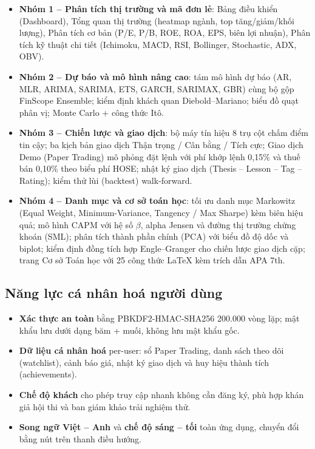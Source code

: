 \documentclass[12pt,a4paper,openany,oneside]{report}
\numberwithin{equation}{chapter}
\begin{document}
\begin{itemize}[leftmargin=22pt,topsep=2pt,itemsep=4pt]
  \item \textbf{Nhóm 1 -- Phân tích thị trường và mã đơn lẻ}: Bảng
        điều khiển (Dashboard), Tổng quan thị trường (heatmap ngành,
        top tăng/giảm/khối lượng), Phân tích cơ bản (P/E, P/B, ROE,
        ROA, EPS, biên lợi nhuận), Phân tích kỹ thuật chi tiết
        (Ichimoku, MACD, RSI, Bollinger, Stochastic, ADX, OBV).
  \item \textbf{Nhóm 2 -- Dự báo và mô hình nâng cao}: tám mô hình dự
        báo (AR, MLR, ARIMA, SARIMA, ETS, GARCH, SARIMAX, GBR) cùng
        bộ gộp FinScope Ensemble; kiểm định khách quan
        Diebold--Mariano; biểu đồ quạt phân vị; Monte Carlo + công
        thức Itô.
  \item \textbf{Nhóm 3 -- Chiến lược và giao dịch}: bộ máy tín hiệu 8
        trụ cột chấm điểm tin cậy; ba kịch bản giao dịch Thận trọng /
        Cân bằng / Tích cực; Giao dịch Demo (Paper Trading) mô phỏng
        đặt lệnh với phí khớp lệnh 0,15\% và thuế bán 0,10\% theo
        biểu phí HOSE; nhật ký giao dịch (Thesis -- Lesson -- Tag --
        Rating); kiểm thử lùi (backtest) walk-forward.
  \item \textbf{Nhóm 4 -- Danh mục và cơ sở toán học}: tối ưu danh mục
        Markowitz (Equal Weight, Minimum-Variance, Tangency / Max
        Sharpe) kèm biên hiệu quả; mô hình CAPM với hệ số $\beta$,
        alpha Jensen và đường thị trường chứng khoán (SML); phân tích
        thành phần chính (PCA) với biểu đồ độ dốc và biplot; kiểm
        định đồng tích hợp Engle--Granger cho chiến lược giao dịch
        cặp; trang Cơ sở Toán học với 25 công thức LaTeX kèm trích dẫn
        APA 7th.
\end{itemize}

\subsection{Năng lực cá nhân hoá người dùng}

\begin{itemize}[leftmargin=22pt,topsep=2pt,itemsep=3pt]
  \item \textbf{Xác thực an toàn} bằng PBKDF2-HMAC-SHA256 200.000 vòng
        lặp; mật khẩu lưu dưới dạng băm + muối, không lưu mật khẩu
        gốc.
  \item \textbf{Dữ liệu cá nhân hoá} per-user: sổ Paper Trading,
        danh sách theo dõi (watchlist), cảnh báo giá, nhật ký giao
        dịch và huy hiệu thành tích (achievements).
  \item \textbf{Chế độ khách} cho phép truy cập nhanh không cần đăng
        ký, phù hợp khán giả hội thi và ban giám khảo trải nghiệm
        thử.
  \item \textbf{Song ngữ Việt -- Anh} và \textbf{chế độ sáng -- tối}
        toàn ứng dụng, chuyển đổi bằng nút trên thanh điều hướng.
\end{itemize}
\end{document}
